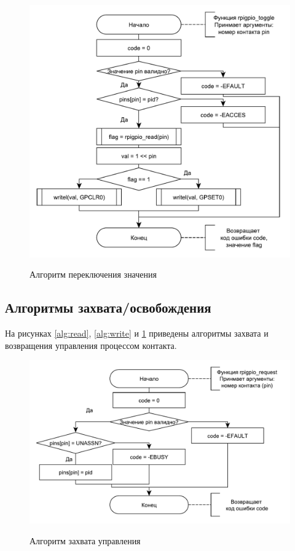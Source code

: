 \begin{figure}[h!] 
	\begin{center}
		{\includegraphics[scale=0.7, angle=0]{img/toggle.pdf}}
		\caption{Алгоритм переключения значения}
		\label{alg:toggle}
	\end{center}
\end{figure}

\subsection{Алгоритмы захвата/освобождения}
На рисунках \ref{alg:read}, \ref{alg:write} и \ref{alg:toggle} приведены алгоритмы захвата и возвращения управления процессом контакта.

\begin{figure}[h!] 
	\begin{center}
		{\includegraphics[scale=0.7, angle=0]{img/request.pdf}}
		\caption{Алгоритм захвата управления}
		\label{alg:request}
	\end{center}
\end{figure}

